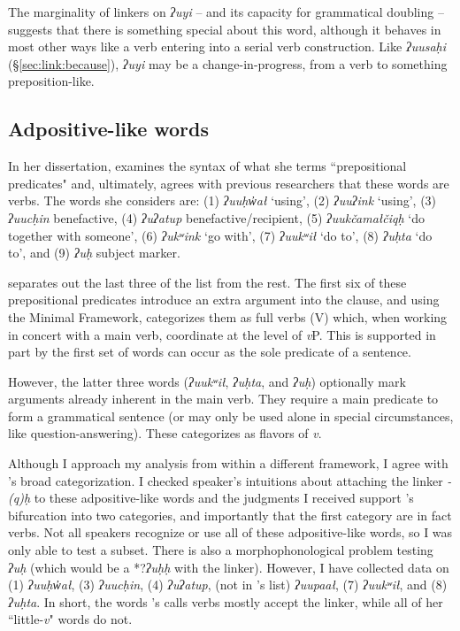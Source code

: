 The marginality of linkers on \textit{ʔuyi} -- and its capacity for grammatical doubling -- suggests that there is something special about this word, although it behaves in most other ways like a verb entering into a serial verb construction. Like \textit{ʔuusaḥi} (\S\ref{sec:link:because}), \textit{ʔuyi} may be a change-in-progress, from a verb to something preposition-like.

\subsection{Adpositive-like words} \label{sec:link:adpositive}

In her dissertation, \cite{woo2007b} examines the syntax of what she terms ``prepositional predicates" and, ultimately, agrees with previous researchers that these words are verbs. The words she considers are: (1) \textit{ʔuuḥw̓ał} `using', (2) \textit{ʔuuʔink} `using', (3) \textit{ʔuucḥin} benefactive, (4) \textit{ʔuʔatup} benefactive/recipient, (5) \textit{ʔuukčamałčiqḥ} `do together with someone', (6) \textit{ʔukʷink} `go with', (7) \textit{ʔuukʷił} `do to', (8) \textit{ʔuḥta} `do to', and (9) \textit{ʔuḥ} subject marker.

\citeauthor{woo2007b} separates out the last three of the list from the rest. The first six of these prepositional predicates introduce an extra argument into the clause, and using the Minimal Framework, \citeauthor{woo2007b} categorizes them as full verbs (V) which, when working in concert with a main verb, coordinate at the level of \textit{v}P. This is supported in part by the first set of words can occur as the sole predicate of a sentence.

However, the  latter three words (\textit{ʔuukʷił}, \textit{ʔuḥta}, and \textit{ʔuḥ}) optionally mark arguments already inherent in the main verb. They require a main predicate to form a grammatical sentence (or may only be used alone in special circumstances, like question-answering). These \citeauthor{woo2007b} categorizes as flavors of \textit{v}.

Although I approach my analysis from within a different framework, I agree with \citeauthor{woo2007b}'s broad categorization. I checked speaker's intuitions about attaching the linker \textit{-(q)ḥ} to these adpositive-like words and the judgments I received support \citeauthor{woo2007b}'s bifurcation into two categories, and importantly that the first category are in fact verbs. Not all speakers recognize or use all of these adpositive-like words, so I was only able to test a subset. There is also a morphophonological problem testing \textit{ʔuḥ} (which would be a *?\textit{ʔuḥḥ} with the linker). However, I have collected data on (1) \textit{ʔuuḥw̓ał}, (3) \textit{ʔuucḥin}, (4) \textit{ʔuʔatup}, (not in \citeauthor{woo2007b}'s list) \textit{ʔuupaał}, (7) \textit{ʔuukʷił}, and (8) \textit{ʔuḥta}. In short, the words \citeauthor{woo2007b}'s calls verbs mostly accept the linker, while all of her ``little-\textit{v}" words do not.

